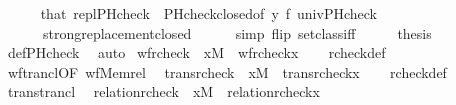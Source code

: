 \begin{isabellebody}
\ \ \ \ \isamarkupfalse%
\ that\ repl{\isacharunderscore}{\kern0pt}PHcheck\ \ PHcheck{\isacharunderscore}{\kern0pt}closed{\isacharbrackleft}{\kern0pt}of\ y\ f{\isacharbrackright}{\kern0pt}\ univ{\isacharunderscore}{\kern0pt}PHcheck\isanewline
\ \ \ \ \ \ strong{\isacharunderscore}{\kern0pt}replacement{\isacharunderscore}{\kern0pt}closed\isanewline
\ \ \ \ \isamarkupfalse%
\ {\isacharparenleft}{\kern0pt}simp\ flip{\isacharcolon}{\kern0pt}\ setclass{\isacharunderscore}{\kern0pt}iff{\isacharparenright}{\kern0pt}\isanewline
\ \ \isamarkupfalse%
\ \isamarkupfalse%
\ {\isacharquery}{\kern0pt}thesis\ \isamarkupfalse%
\ def{\isacharunderscore}{\kern0pt}PHcheck\ \isamarkupfalse%
\ auto\isanewline
{}\isamarkupfalse%
%
\endisatagproof
{\isafoldproof}%
%
\isadelimproof
\isanewline
%
\endisadelimproof
\isanewline
{}\isamarkupfalse%
\ wf{\isacharunderscore}{\kern0pt}rcheck\ {\isacharcolon}{\kern0pt}\ {\isachardoublequoteopen}x{\isasymin}M\ {\isasymLongrightarrow}\ wf{\isacharparenleft}{\kern0pt}rcheck{\isacharparenleft}{\kern0pt}x{\isacharparenright}{\kern0pt}{\isacharparenright}{\kern0pt}{\isachardoublequoteclose}\isanewline
%
\isadelimproof
\ \ %
\endisadelimproof
%
\isatagproof
{}\isamarkupfalse%
\ rcheck{\isacharunderscore}{\kern0pt}def\ \isamarkupfalse%
\ wf{\isacharunderscore}{\kern0pt}trancl{\isacharbrackleft}{\kern0pt}OF\ wf{\isacharunderscore}{\kern0pt}Memrel{\isacharbrackright}{\kern0pt}\ \isacommand{{\isachardot}{\kern0pt}}\isamarkupfalse%
%
\endisatagproof
{\isafoldproof}%
%
\isadelimproof
\isanewline
%
\endisadelimproof
\isanewline
{}\isamarkupfalse%
\ trans{\isacharunderscore}{\kern0pt}rcheck\ {\isacharcolon}{\kern0pt}\ {\isachardoublequoteopen}x{\isasymin}M\ {\isasymLongrightarrow}\ trans{\isacharparenleft}{\kern0pt}rcheck{\isacharparenleft}{\kern0pt}x{\isacharparenright}{\kern0pt}{\isacharparenright}{\kern0pt}{\isachardoublequoteclose}\isanewline
%
\isadelimproof
\ \ %
\endisadelimproof
%
\isatagproof
{}\isamarkupfalse%
\ rcheck{\isacharunderscore}{\kern0pt}def\ \isamarkupfalse%
\ trans{\isacharunderscore}{\kern0pt}trancl\ \isacommand{{\isachardot}{\kern0pt}}\isamarkupfalse%
%
\endisatagproof
{\isafoldproof}%
%
\isadelimproof
\isanewline
%
\endisadelimproof
\isanewline
{}\isamarkupfalse%
\ relation{\isacharunderscore}{\kern0pt}rcheck\ {\isacharcolon}{\kern0pt}\ {\isachardoublequoteopen}x{\isasymin}M\ {\isasymLongrightarrow}\ relation{\isacharparenleft}{\kern0pt}rcheck{\isacharparenleft}{\kern0pt}x{\isacharparenright}{\kern0pt}{\isacharparenright}{\kern0pt}{\isachardoublequoteclose}\isanewline

\end{isabellebody}
